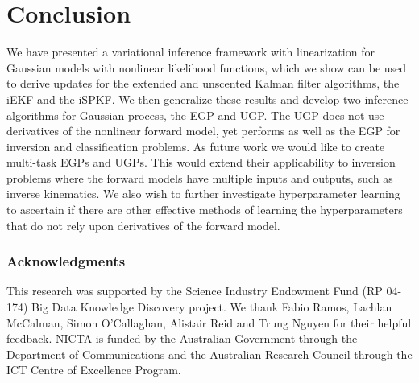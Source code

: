 \documentclass{article} %
\begin{document}
\section{Conclusion}

We have presented a variational inference framework with linearization for
Gaussian models with nonlinear likelihood functions, which we show can be used
to derive updates for the extended and unscented Kalman filter algorithms, the
iEKF and the iSPKF. We then generalize these results and develop two inference
algorithms for Gaussian process, the EGP and UGP. The UGP does not use
derivatives of the nonlinear forward model, yet performs as well as the EGP for
inversion and classification problems. As future work we would like to create
multi-task EGPs and UGPs. This would extend their applicability to inversion
problems where the forward models have multiple inputs and outputs, such as
inverse kinematics. We also wish to further investigate hyperparameter learning
to ascertain if there are other effective methods of learning the
hyperparameters that do not rely upon derivatives of the forward model. 


\subsubsection*{Acknowledgments}
{
\small
This research was supported by the Science Industry Endowment Fund (RP 04-174)
Big Data Knowledge Discovery project. We thank Fabio
Ramos, Lachlan McCalman, Simon O'Callaghan, Alistair Reid and Trung Nguyen for 
their helpful feedback.
%
NICTA is funded by the Australian Government through the Department of 
Communications and the Australian Research Council through the ICT Centre of Excellence Program.

}




\end{document}
